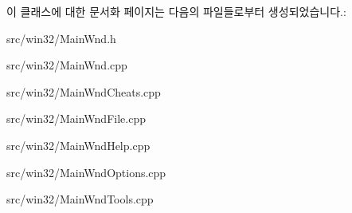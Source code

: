 이 클래스에 대한 문서화 페이지는 다음의 파일들로부터 생성되었습니다.\+:\begin{DoxyCompactItemize}
\item 
src/win32/Main\+Wnd.\+h\item 
src/win32/Main\+Wnd.\+cpp\item 
src/win32/Main\+Wnd\+Cheats.\+cpp\item 
src/win32/Main\+Wnd\+File.\+cpp\item 
src/win32/Main\+Wnd\+Help.\+cpp\item 
src/win32/Main\+Wnd\+Options.\+cpp\item 
src/win32/Main\+Wnd\+Tools.\+cpp\end{DoxyCompactItemize}
